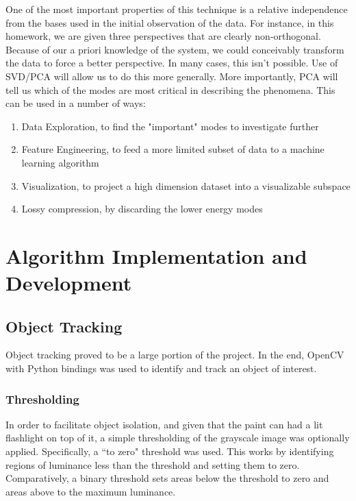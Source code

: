 \documentclass[journal]{IEEEtran}
\begin{document}
One of the most important properties of this technique is a relative independence from the bases used in the initial observation of the data. For instance, in this homework, we are given three perspectives that are clearly non-orthogonal. Because of our a priori knowledge of the system, we could conceivably transform the data to force a better perspective. In many cases, this isn't possible. Use of SVD/PCA will allow us to do this more generally. More importantly, PCA will tell us which of the modes are most critical in describing the phenomena. This can be used in a number of ways:

\begin{enumerate}
	\item Data Exploration, to find the "important" modes to investigate further
	\item Feature Engineering, to feed a more limited subset of data to a machine learning algorithm
	\item Visualization, to project a high dimension dataset into a visualizable subspace
	\item Lossy compression, by discarding the lower energy modes
\end{enumerate}

\section{Algorithm Implementation and Development}

\subsection{Object Tracking}

Object tracking proved to be a large portion of the project. In the end, OpenCV with Python bindings was used to identify and track an object of interest.

\subsubsection{Thresholding}
In order to facilitate object isolation, and given that the paint can had a lit flashlight on top of it, a simple
thresholding of the grayscale image was optionally applied. Specifically, a ``to zero" threshold was used. This works by identifying regions of luminance less than the threshold and setting them to zero. Comparatively, a binary threshold sets areas below the threshold to zero and areas above to the maximum luminance. 
\end{document}
